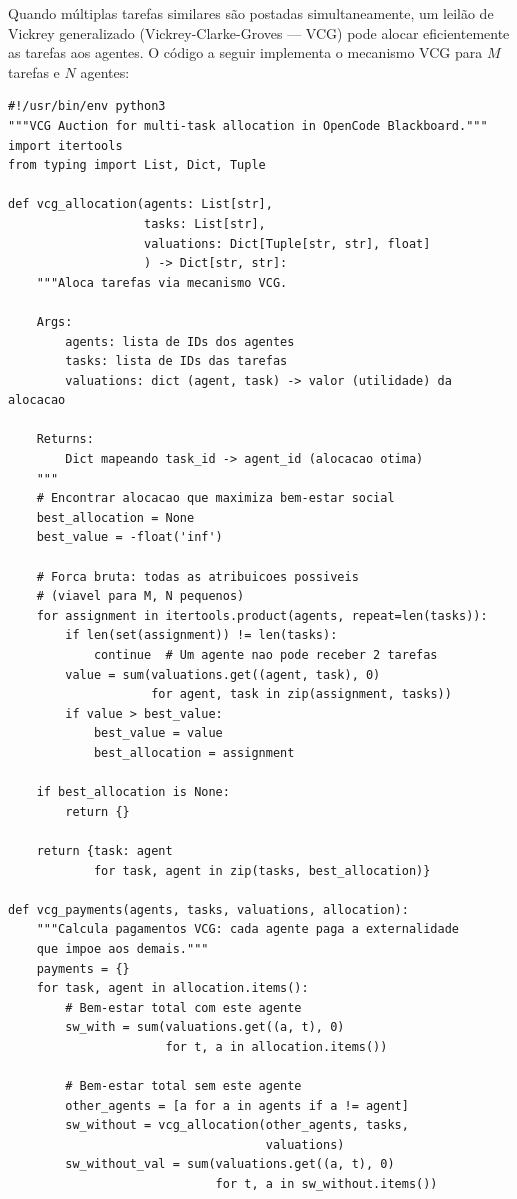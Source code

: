 Quando múltiplas tarefas similares são postadas simultaneamente, um leilão de Vickrey generalizado (Vickrey-Clarke-Groves --- VCG) pode alocar eficientemente as tarefas aos agentes. O código a seguir implementa o mecanismo VCG para $M$ tarefas e $N$ agentes:

\begin{verbatim}
#!/usr/bin/env python3
"""VCG Auction for multi-task allocation in OpenCode Blackboard."""
import itertools
from typing import List, Dict, Tuple

def vcg_allocation(agents: List[str],
                   tasks: List[str],
                   valuations: Dict[Tuple[str, str], float]
                   ) -> Dict[str, str]:
    """Aloca tarefas via mecanismo VCG.

    Args:
        agents: lista de IDs dos agentes
        tasks: lista de IDs das tarefas
        valuations: dict (agent, task) -> valor (utilidade) da alocacao

    Returns:
        Dict mapeando task_id -> agent_id (alocacao otima)
    """
    # Encontrar alocacao que maximiza bem-estar social
    best_allocation = None
    best_value = -float('inf')

    # Forca bruta: todas as atribuicoes possiveis
    # (viavel para M, N pequenos)
    for assignment in itertools.product(agents, repeat=len(tasks)):
        if len(set(assignment)) != len(tasks):
            continue  # Um agente nao pode receber 2 tarefas
        value = sum(valuations.get((agent, task), 0)
                    for agent, task in zip(assignment, tasks))
        if value > best_value:
            best_value = value
            best_allocation = assignment

    if best_allocation is None:
        return {}

    return {task: agent
            for task, agent in zip(tasks, best_allocation)}

def vcg_payments(agents, tasks, valuations, allocation):
    """Calcula pagamentos VCG: cada agente paga a externalidade
    que impoe aos demais."""
    payments = {}
    for task, agent in allocation.items():
        # Bem-estar total com este agente
        sw_with = sum(valuations.get((a, t), 0)
                      for t, a in allocation.items())

        # Bem-estar total sem este agente
        other_agents = [a for a in agents if a != agent]
        sw_without = vcg_allocation(other_agents, tasks,
                                    valuations)
        sw_without_val = sum(valuations.get((a, t), 0)
                             for t, a in sw_without.items())


\end{verbatim}
